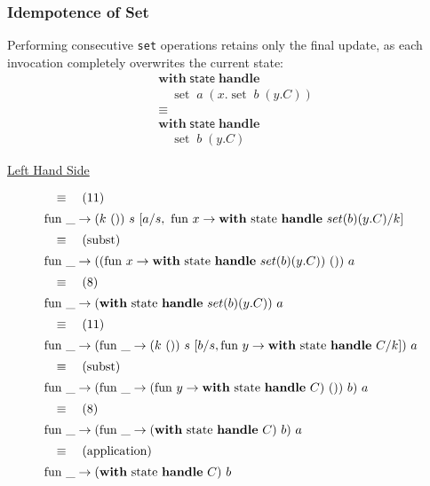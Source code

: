 \documentclass[logo,bsc,singlespacing,parskip]{infthesis}
\begin{document}
\subsubsection*{Idempotence of Set}
Performing consecutive \lstinline{set} operations retains only the final update, as each invocation completely overwrites the current state:
\[
\begin{aligned}
    &\mathsf{\textbf{with}} \; \mathsf{state} \; \mathsf{\textbf{handle}} \\
    &\quad \operatorname{set} \; a \; (x. \operatorname{set} \; b \; (y. C)) \\
    &\equiv \\
    &\mathsf{\textbf{with}} \; \mathsf{state} \; \mathsf{\textbf{handle}} \\
    &\quad \operatorname{set} \; b \; (y. C)
\end{aligned}
\]

\underline{Left Hand Side}

\[ 
\begin{array}{l}
\quad\equiv\quad (11) \\[5pt]
\text{fun }\_ \rightarrow (k\ ())\ s\ [a/s,\ \text{fun } x \rightarrow \text{\textbf{with} state \textbf{handle} } set(b)(y.C)/k] \\[5pt]
\quad\equiv\quad (\text{subst}) \\[5pt]
\text{fun }\_ \rightarrow ((\text{fun } x \rightarrow \text{\textbf{with} state \textbf{handle} } set(b)(y.C))\ ())\ a \\[5pt]
\quad\equiv\quad (8) \\[5pt]
\text{fun }\_ \rightarrow (\text{\textbf{with} state \textbf{handle} } set(b)(y.C))\ a \\[5pt]
\quad\equiv\quad (11) \\[5pt]
\text{fun }\_ \rightarrow (\text{fun }\_ \rightarrow (k\ ())\ s\ [b/s, \text{fun } y \rightarrow \text{\textbf{with} state \textbf{handle} } C/k])\ a \\[5pt]
\quad\equiv\quad (\text{subst}) \\[5pt]
\text{fun }\_ \rightarrow (\text{fun }\_ \rightarrow (\text{fun } y \rightarrow \text{\textbf{with} state \textbf{handle} } C)\ ())\ b)\ a \\[5pt]
\quad\equiv\quad (8) \\[5pt]
\text{fun }\_ \rightarrow (\text{fun }\_ \rightarrow (\text{\textbf{with} state \textbf{handle} } C)\ b)\ a \\[5pt]
\quad\equiv\quad (\text{application}) \\[5pt]
\text{fun }\_ \rightarrow (\text{\textbf{with} state \textbf{handle} } C)\ b
\end{array}
\]
\end{document}
